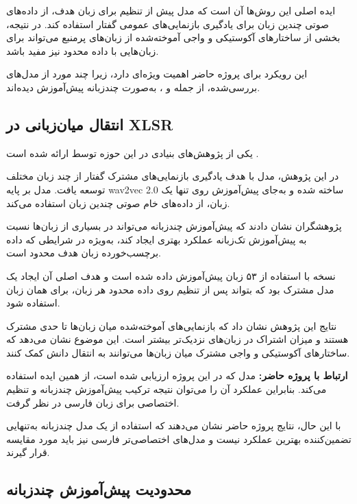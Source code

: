 ایده اصلی این روش‌ها آن است که مدل پیش از تنظیم برای زبان هدف،
از داده‌های صوتی چندین زبان برای یادگیری بازنمایی‌های عمومی
گفتار استفاده کند.
در نتیجه، بخشی از ساختارهای آکوستیکی و واجی آموخته‌شده از
زبان‌های پرمنبع می‌تواند برای زبان‌هایی با داده محدود نیز مفید
باشد.

این رویکرد برای پروژه حاضر اهمیت ویژه‌ای دارد، زیرا چند مورد از
مدل‌های بررسی‌شده، از جمله
و
،
به‌صورت چندزبانه پیش‌آموزش دیده‌اند.


\subsection{انتقال میان‌زبانی در XLSR}

یکی از پژوهش‌های بنیادی در این حوزه توسط
ارائه شده است
\cite{conneau2020xlsr}.

در این پژوهش، مدل
با هدف یادگیری بازنمایی‌های مشترک گفتار از چند زبان مختلف
توسعه یافت.
مدل بر پایه wav2vec 2.0 ساخته شده و به‌جای پیش‌آموزش روی تنها
یک زبان، از داده‌های خام صوتی چندین زبان استفاده می‌کند.

پژوهشگران نشان دادند که پیش‌آموزش چندزبانه می‌تواند در بسیاری
از زبان‌ها نسبت به پیش‌آموزش تک‌زبانه عملکرد بهتری ایجاد کند،
به‌ویژه در شرایطی که داده برچسب‌خورده زبان هدف محدود است.

نسخه
با استفاده از ۵۳ زبان پیش‌آموزش داده شده است و هدف اصلی آن
ایجاد یک مدل مشترک بود که بتواند پس از تنظیم روی داده محدود
هر زبان، برای  همان زبان استفاده شود.

نتایج این پژوهش نشان داد که بازنمایی‌های آموخته‌شده میان
زبان‌ها تا حدی مشترک هستند و میزان اشتراک در زبان‌های نزدیک‌تر
بیشتر است.
این موضوع نشان می‌دهد که ساختارهای آکوستیکی و واجی مشترک میان
زبان‌ها می‌توانند به انتقال دانش کمک کنند.

\textbf{ارتباط با پروژه حاضر:}
مدل
که در این پروژه ارزیابی شده است، از همین ایده استفاده می‌کند.
بنابراین عملکرد آن را می‌توان نتیجه ترکیب پیش‌آموزش چندزبانه و
تنظیم اختصاصی برای زبان فارسی در نظر گرفت.

با این حال، نتایج پروژه حاضر نشان می‌دهند که استفاده از یک
مدل چندزبانه به‌تنهایی تضمین‌کننده بهترین عملکرد نیست و مدل‌های
اختصاصی‌تر فارسی نیز باید مورد مقایسه قرار گیرند.


\subsection{محدودیت پیش‌آموزش چندزبانه}

